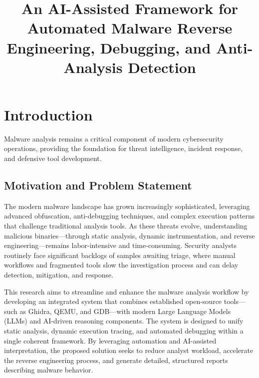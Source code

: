 \documentclass[conference]{IEEEtran}
\begin{document}
\title{An AI-Assisted Framework for Automated Malware Reverse Engineering, Debugging, and Anti-Analysis Detection}

\author{
}

\maketitle

\begin{abstract}
\end{abstract}

\section{Introduction}
Malware analysis remains a critical component of modern cybersecurity operations, providing the foundation for threat intelligence, incident response, and defensive tool development.

\subsection{Motivation and Problem Statement}
The modern malware landscape has grown increasingly sophisticated, leveraging advanced obfuscation, anti-debugging techniques, and complex execution patterns that challenge traditional analysis tools. As these threats evolve, understanding malicious binaries—through static analysis, dynamic instrumentation, and reverse engineering—remains labor-intensive and time-consuming. Security analysts routinely face significant backlogs of samples awaiting triage, where manual workflows and fragmented tools slow the investigation process and can delay detection, mitigation, and response.

This research aims to streamline and enhance the malware analysis workflow by developing an integrated system that combines established open-source tools—such as Ghidra, QEMU, and GDB—with modern Large Language Models (LLMs) and AI-driven reasoning components. The system is designed to unify static analysis, dynamic execution tracing, and automated debugging within a single coherent framework. By leveraging automation and AI-assisted interpretation, the proposed solution seeks to reduce analyst workload, accelerate the reverse engineering process, and generate detailed, structured reports describing malware behavior.
\end{document}
